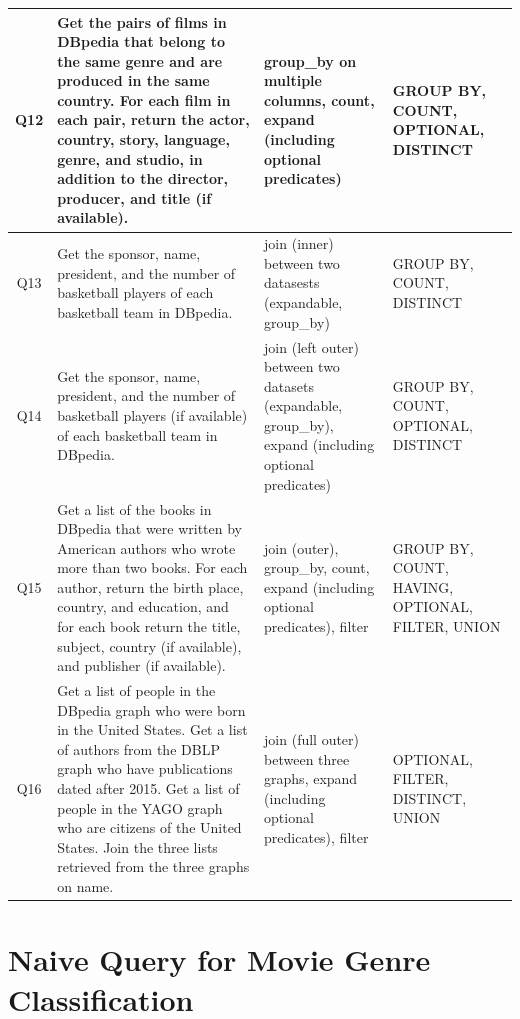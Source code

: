 \begin{table}[th!]
{\begin{tabular}{|c|p{10cm}|p{4cm}|p{3cm}|}
    \\ 
    \hline
    Q12 & Get the pairs of films in DBpedia that belong to the same genre and are produced in the same country. For each film in each pair, return the actor, country, story, language, genre, and studio, in addition to the director, producer, and title (if available). & group\_by on multiple columns, count, expand (including optional predicates) &  GROUP BY, COUNT, OPTIONAL, DISTINCT
    \\
    \hline
    Q13 & Get the sponsor, name, president, and the number of basketball players of each basketball team in DBpedia. & join (inner) between two
    datasests (expandable, group\_by) & GROUP BY, COUNT, DISTINCT
    \\
    \hline 
    Q14 & Get the sponsor, name, president, and the number of basketball players (if available) of each basketball team in DBpedia. & join (left outer) between two datasets (expandable, group\_by), expand (including optional predicates) & GROUP BY, COUNT, OPTIONAL, DISTINCT
    \\
    \hline 
    Q15 & Get a list of the books in DBpedia that were written by American authors who wrote more than two books. For each author, return the birth place, country, and education, and for each book return the title, subject, country (if available), and publisher (if available). &  join (outer), group\_by, count, expand (including optional predicates), filter & GROUP BY, COUNT, HAVING,
    OPTIONAL, FILTER, UNION
    \\
    \hline

    Q16 & Get a list of people in the DBpedia graph who were born in the United States. Get a list of authors from the DBLP graph who have publications dated after 2015. Get a list of people in the YAGO graph who are citizens of the United States. Join the three lists retrieved from the three graphs on name. & join (full outer) between three graphs, expand (including optional predicates), filter & OPTIONAL, FILTER, DISTINCT, UNION
    \\
    \hline
  
  \end{tabular}
  }
\end{table}

\pagebreak
\section{Naive \sparql Query for Movie Genre Classification}
\label{app:naiveQuery}
\vspace*{-2pt}

